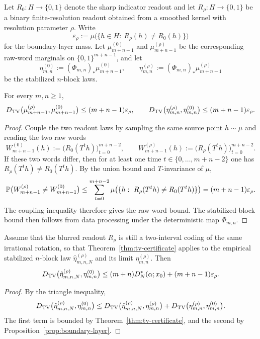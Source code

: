Let $R_0:H\to\{0,1\}$ denote the sharp indicator readout and let $R_\rho:H\to\{0,1\}$ be a binary finite-resolution readout obtained from a smoothed kernel with resolution parameter $\rho$. Write
\[
\varepsilon_\rho
:=
\mu\bigl(\{h\in H:\ R_\rho(h)\neq R_0(h)\}\bigr)
\]
for the boundary-layer mass. Let $\mu_{m+n-1}^{(0)}$ and $\mu_{m+n-1}^{(\rho)}$ be the corresponding raw-word marginals on $\{0,1\}^{m+n-1}$, and let
\[
\eta_{m,n}^{(0)}:=(\Phi_{m,n})_*\mu_{m+n-1}^{(0)},
\qquad
\eta_{m,n}^{(\rho)}:=(\Phi_{m,n})_*\mu_{m+n-1}^{(\rho)}
\]
be the stabilized $n$-block laws.

\begin{proposition}\label{prop:boundary-layer}
For every $m,n\ge 1$,
\[
D_{\mathrm{TV}}\bigl(\mu_{m+n-1}^{(\rho)},\mu_{m+n-1}^{(0)}\bigr)\le (m+n-1)\varepsilon_\rho,
\qquad
D_{\mathrm{TV}}\bigl(\eta_{m,n}^{(\rho)},\eta_{m,n}^{(0)}\bigr)\le (m+n-1)\varepsilon_\rho.
\]
\end{proposition}

\begin{proof}
Couple the two readout laws by sampling the same source point $h\sim\mu$ and reading the two raw words
\[
W_{m+n-1}^{(0)}(h):=\bigl(R_0(T^t h)\bigr)_{t=0}^{m+n-2},
\qquad
W_{m+n-1}^{(\rho)}(h):=\bigl(R_\rho(T^t h)\bigr)_{t=0}^{m+n-2}.
\]
If these two words differ, then for at least one time $t\in\{0,\dots,m+n-2\}$ one has $R_\rho(T^t h)\neq R_0(T^t h)$. By the union bound and $T$-invariance of $\mu$,
\[
\mathbb{P}\bigl(W_{m+n-1}^{(\rho)}\neq W_{m+n-1}^{(0)}\bigr)
\le
\sum_{t=0}^{m+n-2}\mu\bigl(\{h:\ R_\rho(T^t h)\neq R_0(T^t h)\}\bigr)
=
(m+n-1)\varepsilon_\rho.
\]
The coupling inequality therefore gives the raw-word bound. The stabilized-block bound then follows from data processing under the deterministic map $\Phi_{m,n}$.
\end{proof}

\begin{corollary}\label{cor:resolution-certificate}
Assume that the blurred readout $R_\rho$ is still a two-interval coding of the same irrational rotation, so that Theorem~\ref{thm:tv-certificate} applies to the empirical stabilized $n$-block law $\hat{\eta}_{m,n,N}^{(\rho)}$ and its limit $\eta_{m,n}^{(\rho)}$. Then
\[
D_{\mathrm{TV}}\bigl(\hat{\eta}_{m,n,N}^{(\rho)},\eta_{m,n}^{(0)}\bigr)
\le
(m+n)D_N^*(\alpha;x_0)+(m+n-1)\varepsilon_\rho.
\]
\end{corollary}

\begin{proof}
By the triangle inequality,
\[
D_{\mathrm{TV}}\bigl(\hat{\eta}_{m,n,N}^{(\rho)},\eta_{m,n}^{(0)}\bigr)
\le
D_{\mathrm{TV}}\bigl(\hat{\eta}_{m,n,N}^{(\rho)},\eta_{m,n}^{(\rho)}\bigr)
+
D_{\mathrm{TV}}\bigl(\eta_{m,n}^{(\rho)},\eta_{m,n}^{(0)}\bigr).
\]
The first term is bounded by Theorem~\ref{thm:tv-certificate}, and the second by Proposition~\ref{prop:boundary-layer}.
\end{proof}

